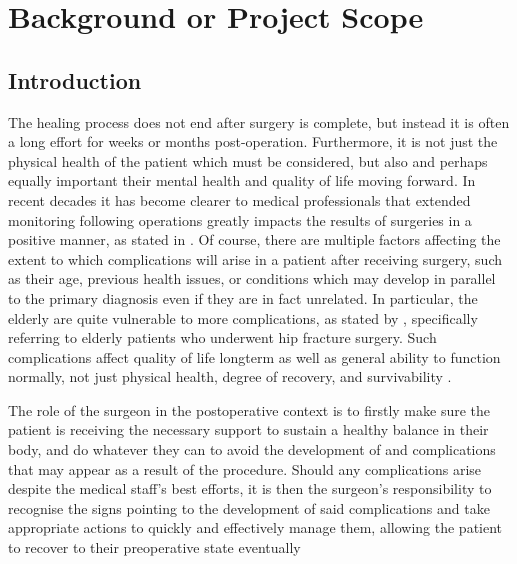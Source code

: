 \chapter{Background or Project Scope}

\section{Introduction} %
The healing process does not end after surgery is complete, but instead it is often a long effort for weeks or months post-operation. Furthermore, it is not just the physical health of the patient which must be considered, but also and perhaps equally important their mental health and quality of life moving forward. In recent decades it has become clearer to medical professionals that extended monitoring following operations greatly impacts the results of surgeries in a positive manner, as stated in \cite{d2014defining}. Of course, there are multiple factors affecting the extent to which complications will arise in a patient after receiving surgery, such as their age, previous health issues, or conditions which may develop in parallel to the primary diagnosis even if they are in fact unrelated. In particular, the elderly are quite vulnerable to more complications, as stated by \cite{kare2024post}, specifically referring to elderly patients who underwent hip fracture surgery. Such complications affect quality of life longterm as well as general ability to function normally, not just physical health, degree of recovery, and survivability \cite{kare2024post}.

The role of the surgeon in the postoperative context is to firstly make sure the patient is receiving the necessary support to sustain a healthy balance in their body, and do whatever they can to avoid the development of and complications that may appear as a result of the procedure. Should any complications arise despite the medical staff's best efforts, it is then the surgeon's responsibility to recognise the signs pointing to the development of said complications and take appropriate actions to quickly and effectively manage them, allowing the patient to recover to their preoperative state eventually \cite{Surwit_Tam_2008}

